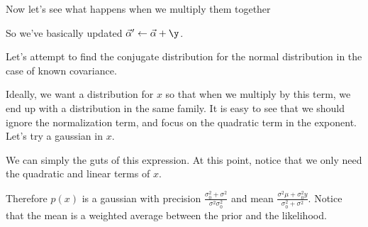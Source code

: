 \documentclass[12pt]{article}
\begin{document}

Now let's see what happens when we multiply them together


So we've basically updated $\vec \alpha' \leftarrow \vec \alpha+\y$.

Let's attempt to find the conjugate distribution for the normal distribution in the case of known covariance.


Ideally, we want a distribution for $x$ so that when we multiply by this term, we end up with a distribution in the same family. It is easy to see that we should ignore the normalization term, and focus on the quadratic term in the exponent. Let's try a gaussian in $x$.


We can simply the guts of this expression. At this point, notice that we only need the quadratic and linear terms of $x$. 


Therefore $p(x)$ is a gaussian with precision $\frac{\sigma_0^2 + \sigma^2}{\sigma^2 \sigma_0^2}$ and mean $\frac{\sigma^2 \mu + \sigma_0^2 y}{\sigma_0^2 + \sigma^2}$. Notice that the mean is a weighted average between the prior and the likelihood.
\end{document}
